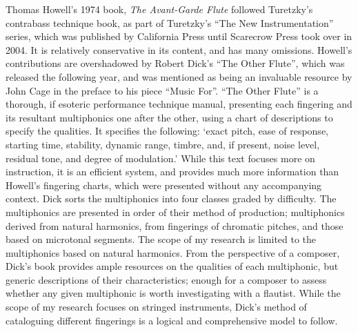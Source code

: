 Thomas Howell’s 1974 book, \textit{The Avant-Garde Flute} followed Turetzky’s contrabass technique book, as part of Turetzky’s “The New Instrumentation” series, which was published by California Press until Scarecrow Press took over in 2004.\autocite[4]{fallowfieldCelloMapHandbook2009}  It is relatively conservative in its content, and has many omissions. Howell’s contributions are overshadowed by Robert Dick’s “The Other Flute”, which was released the following year, and was mentioned as being an invaluable resource by John Cage in the preface to his piece “Music For”.\autocite{cageMusicPartsVoice1984}  “The Other Flute” is a thorough, if esoteric performance technique manual, presenting each fingering and its resultant multiphonics one after the other, using a chart of descriptions to specify the qualities. It specifies the following: ‘exact pitch, ease of response, starting time, stability, dynamic range, timbre, and, if present, noise level, residual tone, and degree of modulation.’\autocite[84]{dickOtherFlute1989}  While this text focuses more on instruction, it is an efficient system, and provides much more information than Howell’s fingering charts, which were presented without any accompanying context. Dick sorts the multiphonics into four classes graded by difficulty. The multiphonics are presented in order of their method of production; multiphonics derived from natural harmonics, from fingerings of chromatic pitches, and those based on microtonal segments. The scope of my research is limited to the multiphonics based on natural harmonics. From the perspective of a composer, Dick’s book provides ample resources on the qualities of each multiphonic, but generic descriptions of their characteristics; enough for a composer to assess whether any given multiphonic is worth investigating with a flautist. While the scope of my research focuses on stringed instruments, Dick’s method of cataloguing different fingerings is a logical and comprehensive model to follow.

